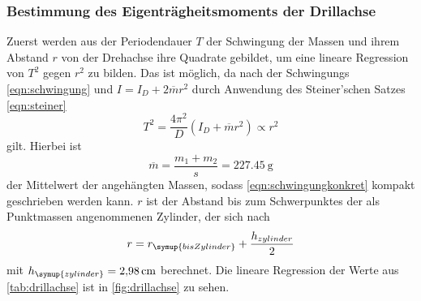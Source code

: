 \subsubsection{Bestimmung des Eigenträgheitsmoments der Drillachse}
Zuerst werden aus der Periodendauer $T$ der Schwingung der Massen und ihrem
Abstand $r$ von der Drehachse ihre Quadrate gebildet, um eine lineare Regression
von $T^2$ gegen $r^2$ zu bilden. Das ist möglich, da nach der Schwingungs
\eqref{eqn:schwingung} und $I=I_D+2\overline{m}r^2$ durch Anwendung des
Steiner'schen Satzes \eqref{eqn:steiner}
\begin{equation}
  T^2 = \frac{4\pi^2}{D}(I_D+\overline{m}r^2)\propto r^2
  \label{eqn:schwingungkonkret}
\end{equation}
gilt. Hierbei ist
\begin{equation}
  \overline{m} = \frac{m_1+m_2}{s} =\SI{227.45}{\gram}
\end{equation}
der Mittelwert der angehängten Massen, sodass \eqref{eqn:schwingungkonkret}
kompakt geschrieben werden kann. $r$ ist der Abstand bis zum Schwerpunktes der
als Punktmassen angenommenen Zylinder, der sich nach
\begin{equation}
  r = r_{\symup{bis Zylinder}}
      +\frac{h_{zylinder}}{2}
\end{equation}
mit $h_{\symup{zylinder}} = \SI{2.98}{cm}$ berechnet.
Die lineare Regression der Werte aus \ref{tab:drillachse} ist in
\ref{fig:drillachse} zu sehen.

